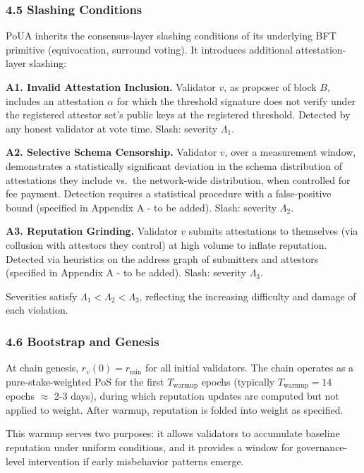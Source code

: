 \documentclass[
  11pt,
]{article}
\begin{document}
\subsubsection{4.5 Slashing Conditions}\label{slashing-conditions}

PoUA inherits the consensus-layer slashing conditions of its underlying
BFT primitive (equivocation, surround voting). It introduces additional
attestation-layer slashing:

\textbf{A1. Invalid Attestation Inclusion.} Validator \(v\), as proposer
of block \(B\), includes an attestation \(\alpha\) for which the
threshold signature does not verify under the registered attestor set's
public keys at the registered threshold. Detected by any honest
validator at vote time. Slash: severity \(\Lambda_1\).

\textbf{A2. Selective Schema Censorship.} Validator \(v\), over a
measurement window, demonstrates a statistically significant deviation
in the schema distribution of attestations they include vs.~the
network-wide distribution, when controlled for fee payment. Detection
requires a statistical procedure with a false-positive bound (specified
in Appendix A - to be added). Slash: severity \(\Lambda_2\).

\textbf{A3. Reputation Grinding.} Validator \(v\) submits attestations
to themselves (via collusion with attestors they control) at high volume
to inflate reputation. Detected via heuristics on the address graph of
submitters and attestors (specified in Appendix A - to be added). Slash:
severity \(\Lambda_3\).

Severities satisfy \(\Lambda_1 < \Lambda_2 < \Lambda_3\), reflecting the
increasing difficulty and damage of each violation.

\subsubsection{4.6 Bootstrap and Genesis}\label{bootstrap-and-genesis}

At chain genesis, \(r_v(0) = r_{\min}\) for all initial validators. The
chain operates as a pure-stake-weighted PoS for the first
\(T_{\text{warmup}}\) epochs (typically \(T_{\text{warmup}} = 14\)
epochs \(\approx\) 2-3 days), during which reputation updates are
computed but not applied to weight. After warmup, reputation is folded
into weight as specified.

This warmup serves two purposes: it allows validators to accumulate
baseline reputation under uniform conditions, and it provides a window
for governance-level intervention if early misbehavior patterns emerge.
\end{document}
